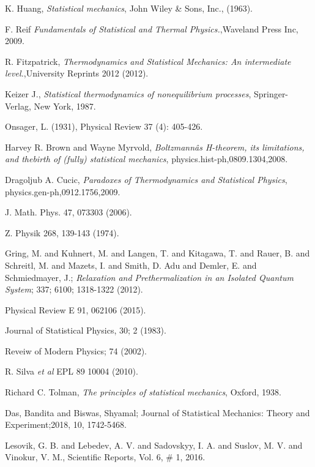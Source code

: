 \documentclass{article}
\begin{document}
\begin{thebibliography}{}


K. Huang, \emph{Statistical mechanics}, John Wiley \& Sons, Inc., (1963).

F. Reif {\it Fundamentals of Statistical and Thermal Physics.},Waveland Press Inc, 2009.

R. Fitzpatrick, {\it Thermodynamics and Statistical Mechanics: An intermediate level.},University Reprints 2012 (2012).

Keizer J., \emph{Statistical thermodynamics of nonequilibrium processes}, Springer-Verlag, New York, 1987.

Onsager, L. (1931), Physical Review 37 (4): 405-426.

Harvey R. Brown and Wayne Myrvold, {\it Boltzmannâs H-theorem, its limitations, and thebirth of (fully) statistical mechanics}, physics.hist-ph,0809.1304,2008.

Dragoljub A. Cucic, {\it Paradoxes of Thermodynamics and Statistical Physics}, physics.gen-ph,0912.1756,2009.

J. Math. Phys. 47, 073303 (2006).

Z. Physik 268, 139-143 (1974).

Gring, M. and Kuhnert, M. and Langen, T. and Kitagawa, T. and Rauer, B. and Schreitl, M. and Mazets, I. and Smith, D. Adu and Demler, E. and Schmiedmayer, J.; {\it Relaxation and Prethermalization in an Isolated Quantum System}; 337; 6100; 1318-1322 (2012).

Physical Review E 91, 062106 (2015).

Journal of Statistical Physics, 30; 2 (1983).

Reveiw of Modern Physics; 74 (2002).

R. Silva {\it et al} EPL 89 10004 (2010).



 Richard C. Tolman, \emph{The principles of statistical mechanics}, Oxford, 1938.

Das, Bandita and Biswas, Shyamal; Journal of Statistical Mechanics: Theory and Experiment;2018, 10, 1742-5468. 

Lesovik, G. B. and Lebedev, A. V. and Sadovskyy, I. A. and Suslov, M. V. and Vinokur, V. M., Scientific Reports, Vol. 6, \# 1, 2016.




\end{thebibliography}{}
\end{document}
